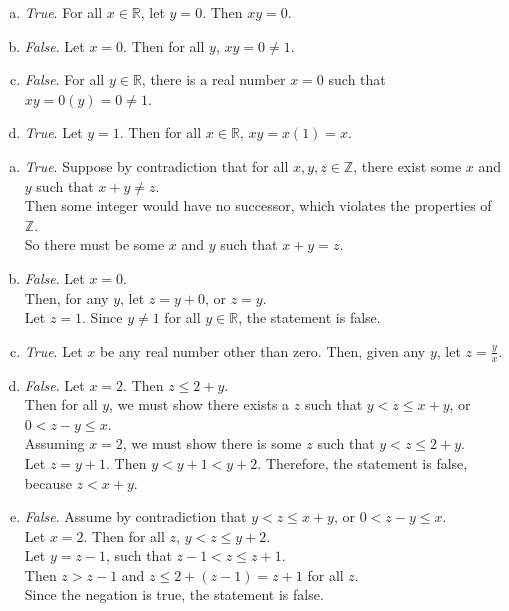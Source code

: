 \documentclass[12pt]{scrartcl} %
\begin{document}
\begin{enumerate}[(a)]
	\item \emph{True}. For all $x \in \mathbb{R}$, let $y = 0$. Then $xy = 0$.
	\item \emph{False}. Let $x = 0$. Then for all $y$, $xy = 0 \neq 1$.
	\item \emph{False}. For all $y \in \mathbb{R}$, there is a real number $x = 0$ such that $xy = 0(y) = 0 \neq 1$.
	\item \emph{True}. Let $y = 1$. Then for all $x \in \mathbb{R}$, $xy = x(1) = x$.
\end{enumerate}

\begin{enumerate}[(a)]
	\item \emph{True}. Suppose by contradiction that for all $x, y, z \in \mathbb{Z}$, there exist some $x$ and $y$ such that $x + y \neq z$. \\Then some integer would have no successor, which violates the properties of $\mathbb Z$. \\So there must be some $x$ and $y$ such that $x + y = z$.
	\item \emph{False}. Let $x = 0$.\\ Then, for any $y$, let $z = y + 0$, or $z = y$.\\
	Let $z = 1$. Since $y \neq 1$ for all $y \in \mathbb{R}$, the statement is false.
	\item \emph{True}. Let $x$ be any real number other than zero. Then, given any $y$, let $z = \frac{y}{x}$.
	\item \emph{False}. Let $x = 2$. Then $z \leq 2 + y$.\\
	Then for all $y$, we must show there exists a $z$ such that $y < z \leq x + y$, or $0 < z - y \leq x$.\\
	Assuming $x = 2$, we must show there is some $z$ such that $y < z \leq 2 + y$. \\Let $z = y + 1$. Then $y < y + 1 < y + 2$. Therefore, the statement is false, because $z < x + y$.
	\item \emph{False}. Assume by contradiction that $y < z \leq x + y$, or $0 < z - y \leq x$.\\
	Let $x = 2$. Then for all $z$, $y < z \leq y + 2$.\\
	Let $y = z - 1$, such that $z - 1 < z \leq z + 1$.\\
	Then $z > z - 1$ and $z \leq 2 + (z - 1) = z + 1$ for all $z$.\\
	Since the negation is true, the statement is false.
\end{enumerate}
\end{document}

